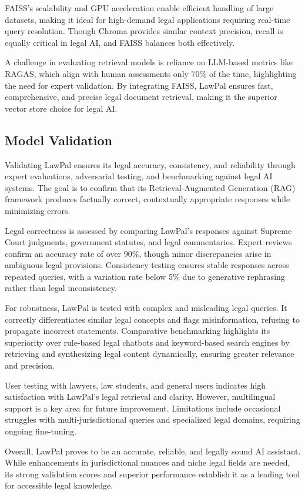 FAISS’s scalability and GPU acceleration enable efficient handling of large datasets, making it ideal for high-demand legal applications requiring real-time query resolution. Though Chroma provides similar context precision, recall is equally critical in legal AI, and FAISS balances both effectively.  

A challenge in evaluating retrieval models is reliance on LLM-based metrics like RAGAS\cite{es-etal-2024-ragas}, which align with human assessments only 70\% of the time, highlighting the need for expert validation. By integrating FAISS, LawPal ensures fast, comprehensive, and precise legal document retrieval, making it the superior vector store choice for legal AI.

\subsection{Model Validation}

Validating LawPal ensures its legal accuracy, consistency, and reliability through expert evaluations, adversarial testing, and benchmarking against legal AI systems. The goal is to confirm that its Retrieval-Augmented Generation (RAG) framework produces factually correct, contextually appropriate responses while minimizing errors.  

Legal correctness is assessed by comparing LawPal’s responses against Supreme Court judgments, government statutes, and legal commentaries. Expert reviews confirm an accuracy rate of over 90\%, though minor discrepancies arise in ambiguous legal provisions. Consistency testing ensures stable responses across repeated queries, with a variation rate below 5\% due to generative rephrasing rather than legal inconsistency.  

For robustness, LawPal is tested with complex and misleading legal queries. It correctly differentiates similar legal concepts and flags misinformation, refusing to propagate incorrect statements. Comparative benchmarking highlights its superiority over rule-based legal chatbots and keyword-based search engines by retrieving and synthesizing legal content dynamically, ensuring greater relevance and precision.  

User testing with lawyers, law students, and general users indicates high satisfaction with LawPal’s legal retrieval and clarity. However, multilingual support is a key area for future improvement. Limitations include occasional struggles with multi-jurisdictional queries and specialized legal domains, requiring ongoing fine-tuning.  

Overall, LawPal proves to be an accurate, reliable, and legally sound AI assistant. While enhancements in jurisdictional nuances and niche legal fields are needed, its strong validation scores and superior performance establish it as a leading tool for accessible legal knowledge.